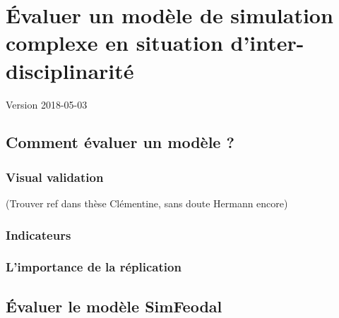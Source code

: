 \chapter{Évaluer un modèle de simulation complexe en situation d'inter-disciplinarité}
\begin{center}
{\large Version 2018-05-03}
\end{center}
\minitoc



\section{Comment évaluer un modèle ?}

\subsection{Visual validation}

(Trouver ref dans thèse Clémentine, sans doute Hermann encore)

\subsection{Indicateurs}

\subsection{L'importance de la réplication}

\section{Évaluer le modèle SimFeodal}


